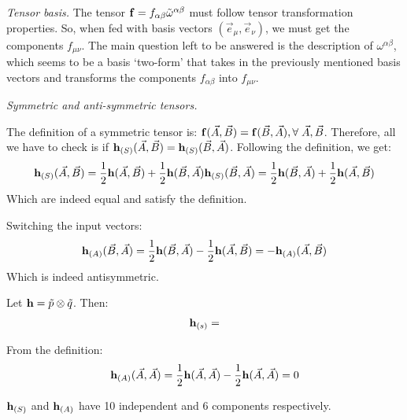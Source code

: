 \documentclass{report}
\begin{document}
\begin{subquests}
	\item \emph{Tensor basis.}
	The tensor ${\vb f} = f_{\alpha\beta} \tilde \omega^{\alpha\beta}$ must follow tensor transformation properties. So, when fed with basis vectors $(\vec e_{\mu}, \vec e_{\nu})$, we must get the components $f_{\mu\nu}$. The main question left to be answered is the description of $\omega^{\alpha\beta}$, which seems to be a basis `two-form' that takes in the previously mentioned basis vectors and transforms the components $f_{\alpha\beta}$ into $f_{\mu\nu}$.

	\item \emph{Symmetric and anti-symmetric tensors.}
	\begin{subquests}
		\item
		The definition of a symmetric tensor is: ${\vb f}(\vec A, \vec B) = {\vb f}(\vec B, \vec A), \forall \; \vec A, \vec B$. Therefore, all we have to check is if ${\vb h}_{(S)}(\vec A, \vec B) = {\vb h}_{(S)}(\vec B, \vec A)$. Following the definition, we get:
		\begin{gather*}
			{\vb h}_{(S)}(\vec A, \vec B) = \frac{1}{2}{\vb h}(\vec A, \vec B) + \frac{1}{2}{\vb h}(\vec B, \vec A)
			{\vb h}_{(S)}(\vec B, \vec A) = \frac{1}{2}{\vb h}(\vec B, \vec A) + \frac{1}{2}{\vb h}(\vec A, \vec B)
		\end{gather*}
		Which are indeed equal and satisfy the definition.

		\item		
		Switching the input vectors:
		\begin{gather*}
			{\vb h}_{(A)}(\vec B, \vec A) = \frac{1}{2}{\vb h}(\vec B, \vec A) - \frac{1}{2}{\vb h}(\vec A, \vec B) = -{\vb h}_{(A)}(\vec A, \vec B)
		\end{gather*}
		Which is indeed antisymmetric.

		\item		
		Let ${\vb h} = \tilde p \otimes \tilde q$. Then:
		\begin{gather*}
			{\vb h}_{(s)} =			
		\end{gather*}
		
		\item
		From the definition:
		\begin{gather*}
			{\vb h}_{(A)}(\vec A, \vec A) = \frac{1}{2}{\vb h}(\vec A, \vec A) - \frac{1}{2}{\vb h}(\vec A, \vec A) = 0
		\end{gather*}

		\item $\vb{h}_{(S)}$ and $\vb{h}_{(A)}$ have 10 independent and 6 components respectively.
	\end{subquests}


\end{subquests}
\end{document}
